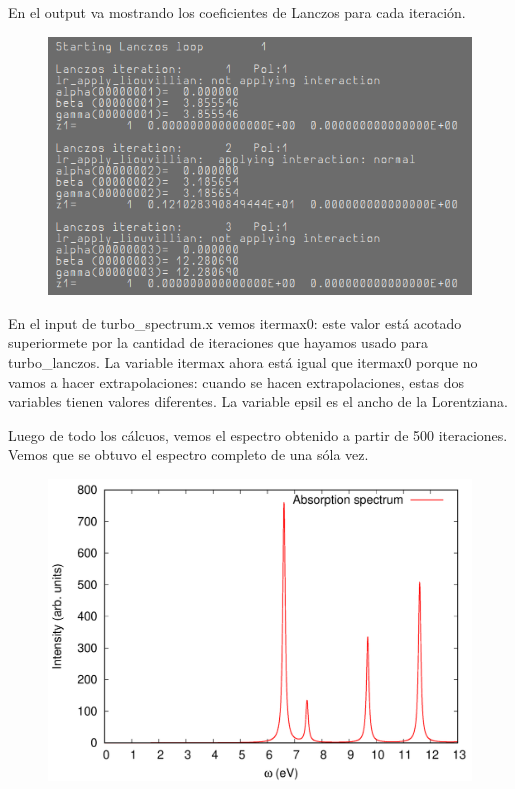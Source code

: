   En el output va mostrando los coeficientes de Lanczos para cada iteración.
  \begin{figure}[H]
      \centering
      \includegraphics[scale = 0.4]{figs/D6/Lanczos_coef.png}
  \end{figure}

  En el input de turbo\_spectrum.x vemos itermax0: este valor está acotado superiormete por la cantidad de iteraciones que hayamos usado para turbo\_lanczos. La variable itermax ahora está igual que itermax0 porque no vamos a hacer extrapolaciones: cuando se hacen extrapolaciones, estas dos variables tienen valores diferentes. La variable epsil es el ancho de la Lorentziana.

  Luego de todo los cálcuos, vemos el espectro obtenido a partir de 500 iteraciones. Vemos que se obtuvo el espectro completo de una sóla vez.
  \begin{figure}[H]
      \centering
      \includegraphics[scale = 0.3]{figs/D6/Lanczos_500.png}
  \end{figure}

